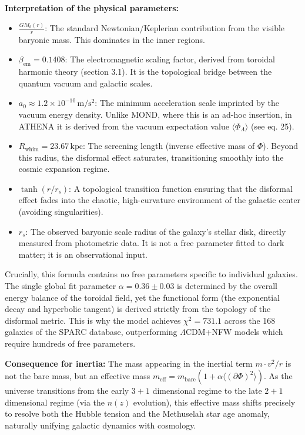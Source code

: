 \documentclass[11pt,a4paper]{article}
\begin{document}
\textbf{Interpretation of the physical parameters:}
\begin{itemize}
    \item \(\displaystyle \frac{G M_b(r)}{r}\): The standard Newtonian/Keplerian contribution from the visible baryonic mass. This dominates in the inner regions.
    \item \(\displaystyle \beta_{\mathrm{em}} = 0.1408\): The electromagnetic scaling factor, derived from toroidal harmonic theory (section 3.1). It is the topological bridge between the quantum vacuum and galactic scales.
    \item \(\displaystyle a_0 \approx 1.2 \times 10^{-10} \, \mathrm{m/s^2}\): The minimum acceleration scale imprinted by the vacuum energy density. Unlike MOND, where this is an ad-hoc insertion, in ATHENA it is derived from the vacuum expectation value \(\langle \Phi_\Lambda \rangle\) (see eq. 25).
    \item \(\displaystyle R_{\mathrm{whim}} = 23.67 \, \mathrm{kpc}\): The screening length (inverse effective mass of \(\Phi\)). Beyond this radius, the disformal effect saturates, transitioning smoothly into the cosmic expansion regime.
    \item \(\displaystyle \tanh(r / r_s)\): A topological transition function ensuring that the disformal effect fades into the chaotic, high-curvature environment of the galactic center (avoiding singularities).
    \item \(\displaystyle r_s\): The observed baryonic scale radius of the galaxy's stellar disk, directly measured from photometric data. It is not a free parameter fitted to dark matter; it is an observational input.
\end{itemize}

Crucially, this formula contains no free parameters specific to individual galaxies. The single global fit parameter \(\alpha = 0.36 \pm 0.03\) is determined by the overall energy balance of the toroidal field, yet the functional form (the exponential decay and hyperbolic tangent) is derived strictly from the topology of the disformal metric. This is why the model achieves \(\chi^2 = 731.1\) across the 168 galaxies of the SPARC database, outperforming \(\Lambda\)CDM+NFW models which require hundreds of free parameters.

\textbf{Consequence for inertia:}
The mass appearing in the inertial term \(m \cdot v^2/r\) is not the bare mass, but an effective mass \(m_{\mathrm{eff}} = m_{\mathrm{bare}} (1 + \alpha \langle (\partial \Phi)^2 \rangle)\). As the universe transitions from the early \(3+1\) dimensional regime to the late \(2+1\) dimensional regime (via the \(n(z)\) evolution), this effective mass shifts precisely to resolve both the Hubble tension and the Methuselah star age anomaly, naturally unifying galactic dynamics with cosmology.
\end{document}
